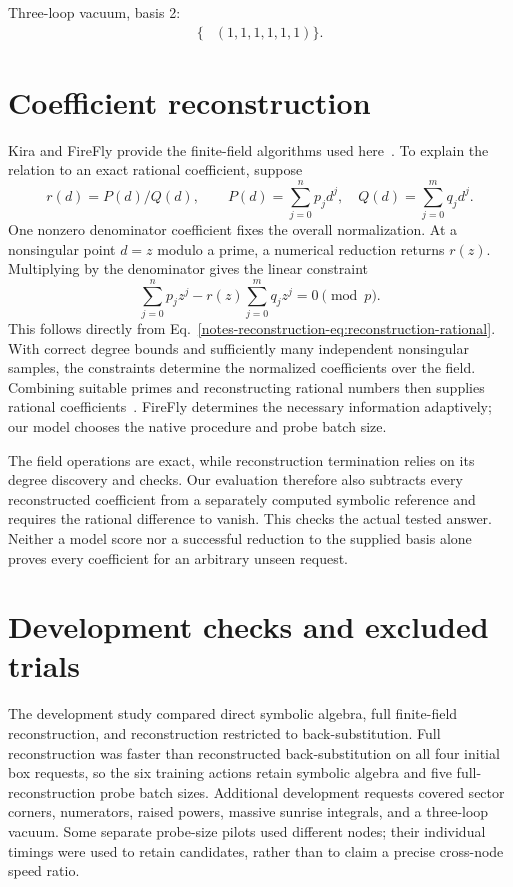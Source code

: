 \documentclass[11pt,a4paper]{article}
\begin{document}
Three-loop vacuum, basis 2:\[\begin{aligned}\{&(1,1,1,1,1,1)\}.\end{aligned}\]


\section{Coefficient reconstruction}
\label{notes-reconstruction-app:reconstruction-algebra}
Kira and FireFly provide the finite-field algorithms used here~\cite{Kira2,FireFly2019,FireFly2020}. To explain the relation to an exact rational coefficient, suppose
\begin{equation}
 r(d)=P(d)/Q(d),\qquad
 P(d)=\sum_{j=0}^{n}p_jd^j,\quad Q(d)=\sum_{j=0}^{m}q_jd^j.
 \label{notes-reconstruction-eq:reconstruction-rational}
\end{equation}
One nonzero denominator coefficient fixes the overall normalization. At a nonsingular point $d=z$ modulo a prime, a numerical reduction returns $r(z)$. Multiplying by the denominator gives the linear constraint
\begin{equation}
 \sum_{j=0}^{n}p_jz^j-r(z)\sum_{j=0}^{m}q_jz^j=0\pmod p.
 \label{notes-reconstruction-eq:reconstruction-sample}
\end{equation}
This follows directly from Eq.~\eqref{notes-reconstruction-eq:reconstruction-rational}. With correct degree bounds and sufficiently many independent nonsingular samples, the constraints determine the normalized coefficients over the field. Combining suitable primes and reconstructing rational numbers then supplies rational coefficients~\cite{FireFly2019,FireFly2020}. FireFly determines the necessary information adaptively; our model chooses the native procedure and probe batch size.

The field operations are exact, while reconstruction termination relies on its degree discovery and checks. Our evaluation therefore also subtracts every reconstructed coefficient from a separately computed symbolic reference and requires the rational difference to vanish. This checks the actual tested answer. Neither a model score nor a successful reduction to the supplied basis alone proves every coefficient for an arbitrary unseen request.


\section{Development checks and excluded trials}
The development study compared direct symbolic algebra, full finite-field reconstruction, and reconstruction restricted to back-substitution. Full reconstruction was faster than reconstructed back-substitution on all four initial box requests, so the six training actions retain symbolic algebra and five full-reconstruction probe batch sizes. Additional development requests covered sector corners, numerators, raised powers, massive sunrise integrals, and a three-loop vacuum. Some separate probe-size pilots used different nodes; their individual timings were used to retain candidates, rather than to claim a precise cross-node speed ratio.
\end{document}
